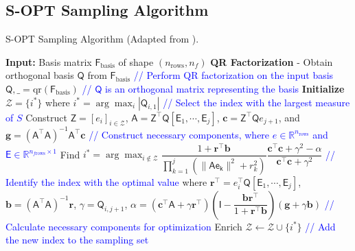 \documentclass[11pt]{article}
\begin{document}
            \subsection{S-OPT Sampling Algorithm}
            \begin{algorithm}[H]
                \caption{S-OPT Sampling Algorithm (Adapted from \cite{lauzon2024s-opt}).}
                \begin{algorithmic}[1]
                    \STATE \textbf{Input:} Basis matrix $\mathsf{F}_{\text{basis}}$ of shape $(n_{\text{rows}}, n_f)$
                    \STATE \textbf{QR Factorization} - Obtain orthogonal basis $\mathsf{Q}$ from $\mathsf{F}_{\text{basis}}$ \textcolor{blue}{// Perform QR factorization on the input basis}
                    \STATE $\mathsf{Q}, \_ = \text{qr}(\mathsf{F}_{\text{basis}})$ \textcolor{blue}{// $\mathsf{Q}$ is an orthogonal matrix representing the basis}
                    \STATE \textbf{Initialize} $\mathcal{Z} = \{i^*\}$ where $i^* = \arg\max_i |\mathsf{Q}_{i,1}|$ \textcolor{blue}{// Select the index with the largest measure of $S$}
                        \STATE Construct $\mathsf{Z} = [\mathit{e}_i]_{i \in \mathcal{Z}}$, $\mathsf{A} = \mathsf{Z}^\top \mathsf{Q} [\mathsf{E}_1, \cdots, \mathsf{E}_j]$, $\mathbf{c} = \mathsf{Z}^\top \mathsf{Q} \mathit{e}_{j+1}$, and $\mathbf{g} = (\mathsf{A}^\top \mathsf{A})^{-1} \mathsf{A}^\top \mathbf{c}$ \textcolor{blue}{// Construct necessary components, where $\mathit{e} \in \mathbb{R}^{n_{\text{rows}}}$ and $\mathsf{E} \in \mathbb{R}^{n_{f\text{rows}} \times 1}$}
                        \STATE Find $i^* = \arg\max_{i \notin \mathcal{Z}} \dfrac{1 + \mathbf{r}^\top \mathbf{b}}{\prod_{k=1}^{j} (\|\mathsf{Ae_k}\|^2 + r_k^2)} \dfrac{\mathbf{c}^\top \mathbf{c} + \gamma^2 - \alpha}{\mathbf{c}^\top \mathbf{c} + \gamma^2}$ \textcolor{blue}{// Identify the index with the optimal value}
                        \STATE where $\mathbf{r}^\top = \mathit{e}_i^\top \mathsf{Q} [\mathsf{E}_1, \cdots, \mathsf{E}_j]$, $\mathbf{b} = (\mathsf{A}^\top \mathsf{A})^{-1} \mathbf{r}$, $\gamma = \mathsf{Q}_{i,j+1}$, \newline$\alpha = (\mathbf{c}^\top \mathsf{A} + \gamma \mathbf{r}^\top) \left( \mathsf{I} - \dfrac{\mathbf{b} \mathbf{r}^\top}{1 + \mathbf{r}^\top \mathbf{b}} \right) (\mathbf{g} + \gamma \mathbf{b})$ \textcolor{blue}{// Calculate necessary components for optimization}
                        \STATE Enrich $\mathcal{Z} \leftarrow \mathcal{Z} \cup \{i^*\}$ \textcolor{blue}{// Add the new index to the sampling set}

\end{algorithmic}
\end{algorithm}
\end{document}
